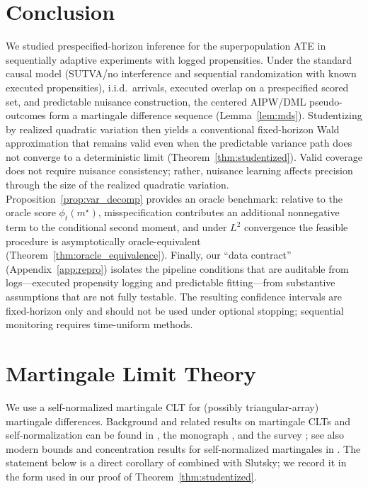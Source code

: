 \documentclass[11pt]{article}
\numberwithin{equation}{section}
\theoremstyle{plain}
\theoremstyle{definition}
\theoremstyle{remark}
\begin{document}
\section{Conclusion}\label{sec:conclusion}
We studied prespecified-horizon inference for the superpopulation ATE in sequentially adaptive experiments with logged propensities. Under the standard causal model (SUTVA/no interference and sequential randomization with known executed propensities), i.i.d.\ arrivals, executed overlap on a prespecified scored set, and predictable nuisance construction, the centered AIPW/DML pseudo-outcomes form a martingale difference sequence (Lemma~\ref{lem:mds}). Studentizing by realized quadratic variation then yields a conventional fixed-horizon Wald approximation that remains valid even when the predictable variance path does not converge to a deterministic limit (Theorem~\ref{thm:studentized}). Valid coverage does not require nuisance consistency; rather, nuisance learning affects precision through the size of the realized quadratic variation. Proposition~\ref{prop:var_decomp} provides an oracle benchmark: relative to the oracle score $\phi_t(m^\star)$, misspecification contributes an additional nonnegative term to the conditional second moment, and under $L^2$ convergence the feasible procedure is asymptotically oracle-equivalent (Theorem~\ref{thm:oracle_equivalence}). Finally, our ``data contract'' (Appendix~\ref{app:repro}) isolates the pipeline conditions that are auditable from logs---executed propensity logging and predictable fitting---from substantive assumptions that are not fully testable. The resulting confidence intervals are fixed-horizon only and should not be used under optional stopping; sequential monitoring requires time-uniform methods.


\newpage
\appendix
\normalsize


\section{Martingale Limit Theory}\label{app:martingale}\label{app:selfnorm_clt}
We use a self-normalized martingale CLT for (possibly triangular-array) martingale differences. Background and related results on martingale CLTs and self-normalization can be found in \citet{hallHeyde1980}, the monograph \citet{delapena2009self}, and the survey \citet{shao2013survey}; see also modern bounds and concentration results for self-normalized martingales in \citet{fanShao2018,fanGramaLiuShao2019,bercuTouati2019}. The statement below is a direct corollary of \citet[Theorem~3.10]{hallHeyde1980} combined with Slutsky; we record it in the form used in our proof of Theorem~\ref{thm:studentized}.
\end{document}
